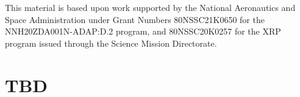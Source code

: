 \documentclass[twocolumn]{aastex631}
\begin{document}
\pagebreak
\newpage

\begin{acknowledgments}
    This material is based upon work supported by the National Aeronautics and Space Administration under Grant Numbers 80NSSC21K0650 for the NNH20ZDA001N-ADAP:D.2 program,
    and 80NSSC20K0257 for the XRP program issued through the Science Mission Directorate.
\end{acknowledgments}








\clearpage

\appendix
\restartappendixnumbering

\section{TBD} \label{appendixLogScale}
\end{document}
